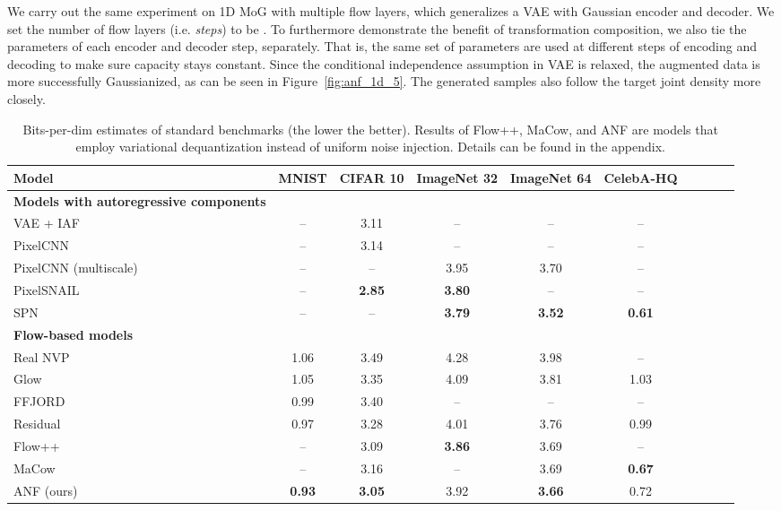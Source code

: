 \documentclass{article}
\begin{document}
We carry out the same experiment on 1D MoG with multiple flow layers, which generalizes a VAE with Gaussian encoder and decoder. 
We set the number of flow layers (i.e. \emph{steps}) to be .
To furthermore demonstrate the benefit of transformation composition, we also tie the parameters of each encoder and decoder step, separately.  
That is, the same set of parameters are used at different steps of encoding and decoding to make sure capacity stays constant. 
Since the conditional independence assumption in VAE is relaxed,
the augmented data is more successfully Gaussianized, as can be seen in Figure~\ref{fig:anf_1d_5}. The generated samples also follow the target joint density more closely. 



\begin{table*}[ht]
\centering
\small
\begin{tabular}{lccccccccc} 
\toprule
{\bf Model} & {\bf MNIST} & {\bf CIFAR 10} & {\bf ImageNet 32} & {\bf ImageNet 64} & {\bf CelebA-HQ} \\ 
\midrule 
\textbf{\small Models with autoregressive components} \\
{VAE + IAF {\small \citep{kingma2016improved}}} & {--} & 3.11 & {--} & {--} & {--}\\
{PixelCNN {\small \citep{oord2016pixel}}} & {--} & 3.14 & {--} & {--} & {--}\\
{PixelCNN (multiscale) {\small \citep{reed2017parallel}}} & {--} & {--} & 3.95 & 3.70 & {--}\\
{PixelSNAIL {\small \citep{chen2017pixelsnail}}} & {--} & \textbf{2.85} & \textbf{3.80} & {--} & {--} \\
{SPN {\small \citep{menick2018generating}}} & {--} & {--} & \textbf{3.79} & \textbf{3.52} & \textbf{0.61}\\
\midrule
\textbf{\small Flow-based models} \\
{Real NVP {\small \citep{dinh2016density}}}  & 1.06 & 3.49 & 4.28 & 3.98 & {--} \\
{Glow {\small \citep{kingma2018glow}}}  &  1.05 & 3.35 & 4.09 & 3.81 & 1.03 \\
{FFJORD {\small \citep{grathwohl2018ffjord}}}  & 0.99 & 3.40 & {--} & {--} & {--} \\
{Residual {\small \citep{chen2019residualflows}}}  & 0.97 & 3.28 & 4.01 & 3.76 & 0.99 \\
{Flow++ {\small \citep{ho2019flow++}}}  & {--} & 3.09 & \textbf{3.86} & 3.69 & {--} \\
{MaCow {\small \citep{ma2019macow}}} & {--} & 3.16 & {--} & 3.69 & \textbf{0.67} \\
\midrule
{ANF (ours)} & \textbf{0.93} & \textbf{3.05} & 3.92 & \textbf{3.66} & 0.72\\
\bottomrule
\end{tabular}
\caption{\small Bits-per-dim estimates of standard benchmarks (the lower the better).
Results of Flow++, MaCow, and ANF are models that employ variational dequantization instead of uniform noise injection. Details can be found in the appendix. 
}
\label{tab:density}
\end{table*}
\end{document}
